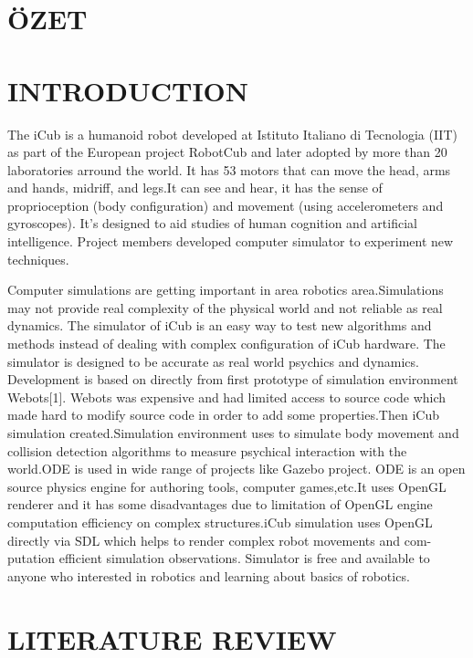 \documentclass[a4paper, 12pt]{report}
\begin{document}
\chapter*{ÖZET}


\chapter{INTRODUCTION}

The iCub is a humanoid robot developed at Istituto Italiano di Tecnologia (IIT) 
as part of the European project RobotCub and later adopted by more than 20 
laboratories arround the world. It has 53 motors that can move the head, arms 
and hands, midriff, and legs.It can see and hear, it has the sense of 
proprioception (body 
configuration) and movement (using accelerometers and gyroscopes).
It’s designed to aid studies of human cognition and artificial 
intelligence. Project members developed computer simulator to experiment new 
techniques.
\par Computer simulations are getting important in area robotics 
area.Simulations may not provide real complexity of the physical world and not 
reliable as real dynamics. The simulator of iCub is an easy way to test new 
algorithms and methods instead of dealing with complex configuration of iCub 
hardware. The simulator is designed to be accurate as real world psychics and 
dynamics. Development is based on directly from first prototype of simulation 
environment Webots[1]. Webots was expensive and had limited access to source 
code which made hard to modify source code in order to add some properties.Then 
iCub simulation created.Simulation environment uses 
\cite{ODE} to simulate 
body movement and collision detection algorithms to measure psychical 
interaction with the world.ODE is used in wide range of projects like Gazebo 
project. ODE is an open source physics engine for authoring tools, computer 
games,etc.It uses OpenGL renderer and it has some disadvantages due to 
limitation of OpenGL engine computation efficiency on complex structures.iCub 
simulation uses OpenGL directly via SDL which helps to render complex robot 
movements and com- putation efficient simulation observations. Simulator is 
free and available to anyone who interested in robotics and learning about 
basics of robotics.


\chapter{LITERATURE REVIEW}
\end{document}
